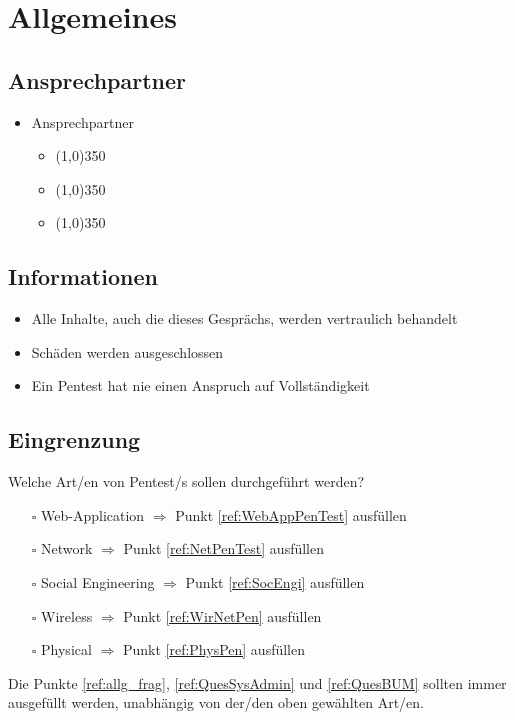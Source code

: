 \documentclass[11pt,DIV=11]{scrartcl} %
\begin{document}
\section{Allgemeines}
\subsection{Ansprechpartner}
\begin{itemize}
	\item Ansprechpartner
	\begin{itemize}
		\item \line(1,0){350}
		\item \line(1,0){350}
		\item \line(1,0){350}
	\end{itemize}
\end{itemize}

\subsection{Informationen}
\begin{itemize}
	\item Alle Inhalte, auch die dieses Gesprächs, werden vertraulich behandelt
	\item Schäden werden ausgeschlossen
	\item Ein Pentest hat nie einen Anspruch auf Vollständigkeit
\end{itemize}

\subsection{Eingrenzung}
Welche Art/en von Pentest/s sollen durchgeführt werden?
\begin{itemize}
	\item[$\square$] Web-Application $\Rightarrow$ Punkt \ref{ref:WebAppPenTest} ausfüllen
	\item[$\square$] Network $\Rightarrow$ Punkt \ref{ref:NetPenTest} ausfüllen
	\item[$\square$] Social Engineering $\Rightarrow$ Punkt \ref{ref:SocEngi} ausfüllen
	\item[$\square$] Wireless $\Rightarrow$ Punkt \ref{ref:WirNetPen} ausfüllen
	\item[$\square$] Physical $\Rightarrow$ Punkt \ref{ref:PhysPen} ausfüllen
\end{itemize}

Die Punkte \ref{ref:allg_frag}, \ref{ref:QuesSysAdmin} und \ref{ref:QuesBUM} sollten immer ausgefüllt werden, unabhängig von der/den oben gewählten Art/en.
$ $\\
\end{document}
